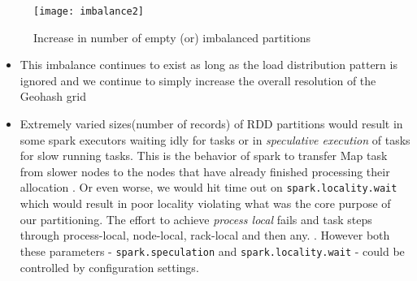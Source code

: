 \documentclass[article,type=msc,colorback,12pt,accentcolor=tud1d]{tudthesis}
\begin{document}
				
				\begin{figure}[hp]
					\centering
					\texttt{[image: imbalance2]}
					\caption{Increase in number of empty (or) imbalanced partitions}
					\label{fig:imbalance2}
				\end{figure}
			
			\clearpage
		
		\begin{itemize}
			\item This imbalance continues to exist as long as the load distribution pattern is ignored and we continue to simply increase the overall resolution of the Geohash grid
			\item Extremely varied sizes(number of records) of RDD partitions would result in some spark executors waiting idly for tasks or in \textit{speculative execution} of tasks for slow running tasks. This is the behavior of spark to  transfer Map task from slower nodes to the nodes that have already finished processing their allocation \cite{sparkspeculation}. Or even worse, we would hit time out on \texttt{spark.locality.wait} which would result in poor locality violating what was the core purpose of our partitioning. The effort to achieve \textit{process local} fails and task steps through process-local, node-local, rack-local and then any. \cite{sparkconfiguration}. However both these parameters - \texttt{spark.speculation} and \texttt{spark.locality.wait} - could be controlled by configuration settings.
		\end{itemize}

		
\end{document}
